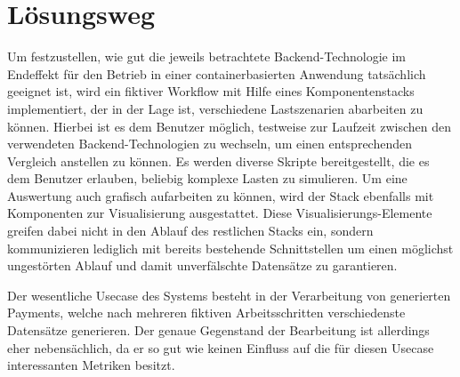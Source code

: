 \section{Lösungsweg \checkmark \checkmark}


Um festzustellen, wie gut die jeweils betrachtete Backend-Technologie im Endeffekt für den Betrieb in einer containerbasierten Anwendung tatsächlich geeignet ist, wird ein fiktiver Workflow mit Hilfe eines Komponentenstacks implementiert, der in der Lage ist, verschiedene Lastszenarien abarbeiten zu können. Hierbei ist es dem Benutzer möglich, testweise zur Laufzeit zwischen den verwendeten Backend-Technologien zu wechseln, um einen entsprechenden Vergleich anstellen zu können. Es werden diverse Skripte bereitgestellt, die es dem Benutzer erlauben, beliebig komplexe Lasten zu simulieren. Um eine Auswertung auch grafisch aufarbeiten zu können, wird der Stack ebenfalls mit Komponenten zur Visualisierung ausgestattet. Diese Visualisierungs-Elemente greifen dabei nicht in den Ablauf des restlichen Stacks ein, sondern kommunizieren lediglich mit bereits bestehende Schnittstellen um einen möglichst ungestörten Ablauf und damit unverfälschte Datensätze zu garantieren. 

Der wesentliche Usecase des Systems besteht in der Verarbeitung von generierten Payments, welche nach mehreren fiktiven Arbeitsschritten verschiedenste Datensätze generieren. Der genaue Gegenstand der Bearbeitung ist allerdings eher nebensächlich, da er so gut wie keinen Einfluss auf die für diesen Usecase interessanten Metriken besitzt. 
